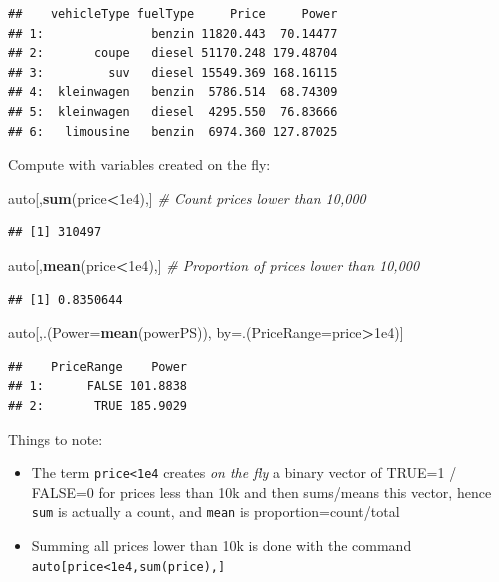\documentclass[]{book}
\newenvironment{Shaded}{\begin{snugshade}}{\end{snugshade}}
\newcommand{\CommentTok}[1]{\textcolor[rgb]{0.56,0.35,0.01}{\textit{#1}}}
\newcommand{\DataTypeTok}[1]{\textcolor[rgb]{0.13,0.29,0.53}{#1}}
\newcommand{\FloatTok}[1]{\textcolor[rgb]{0.00,0.00,0.81}{#1}}
\newcommand{\KeywordTok}[1]{\textcolor[rgb]{0.13,0.29,0.53}{\textbf{#1}}}
\newcommand{\NormalTok}[1]{#1}
\newcommand{\OperatorTok}[1]{\textcolor[rgb]{0.81,0.36,0.00}{\textbf{#1}}}
\providecommand{\tightlist}{%
  \setlength{\itemsep}{0pt}\setlength{\parskip}{0pt}}
\theoremstyle{definition}
\theoremstyle{definition}
\theoremstyle{definition}
\theoremstyle{remark}
\begin{document}
\begin{verbatim}
##    vehicleType fuelType     Price     Power
## 1:               benzin 11820.443  70.14477
## 2:       coupe   diesel 51170.248 179.48704
## 3:         suv   diesel 15549.369 168.16115
## 4:  kleinwagen   benzin  5786.514  68.74309
## 5:  kleinwagen   diesel  4295.550  76.83666
## 6:   limousine   benzin  6974.360 127.87025
\end{verbatim}

Compute with variables created on the fly:

\begin{Shaded}
\begin{Highlighting}[]
\NormalTok{auto[,}\KeywordTok{sum}\NormalTok{(price}\OperatorTok{<}\FloatTok{1e4}\NormalTok{),] }\CommentTok{# Count prices lower than 10,000}
\end{Highlighting}
\end{Shaded}

\begin{verbatim}
## [1] 310497
\end{verbatim}

\begin{Shaded}
\begin{Highlighting}[]
\NormalTok{auto[,}\KeywordTok{mean}\NormalTok{(price}\OperatorTok{<}\FloatTok{1e4}\NormalTok{),] }\CommentTok{# Proportion of prices lower than 10,000}
\end{Highlighting}
\end{Shaded}

\begin{verbatim}
## [1] 0.8350644
\end{verbatim}

\begin{Shaded}
\begin{Highlighting}[]
\NormalTok{auto[,.(}\DataTypeTok{Power=}\KeywordTok{mean}\NormalTok{(powerPS)), by=.(}\DataTypeTok{PriceRange=}\NormalTok{price}\OperatorTok{>}\FloatTok{1e4}\NormalTok{)] }
\end{Highlighting}
\end{Shaded}

\begin{verbatim}
##    PriceRange    Power
## 1:      FALSE 101.8838
## 2:       TRUE 185.9029
\end{verbatim}

Things to note:

\begin{itemize}
\tightlist
\item
  The term \texttt{price\textless{}1e4} creates \emph{on the fly} a binary vector of TRUE=1 / FALSE=0 for prices less than 10k and then sums/means this vector, hence \texttt{sum} is actually a count, and \texttt{mean} is proportion=count/total
\item
  Summing all prices lower than 10k is done with the command \texttt{auto{[}price\textless{}1e4,sum(price),{]}}
\end{itemize}
\end{document}
